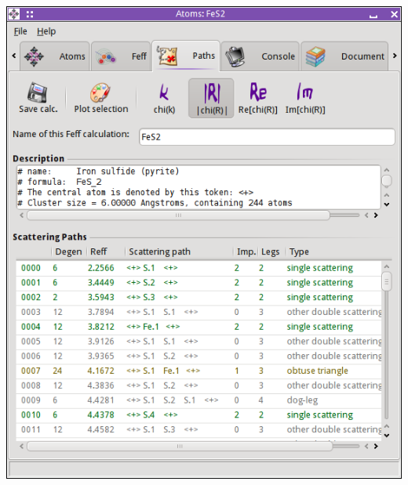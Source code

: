 \documentclass[10pt, xcolor=x11names, compress]{beamer}
\begin{document}
\begin{frame}
\begin{columns}
\begin{column}{0.5\linewidth}
      \includegraphics[width=\linewidth]{images/intrp.png}
    \end{column}
  \end{columns}
\end{frame}
\end{document}
